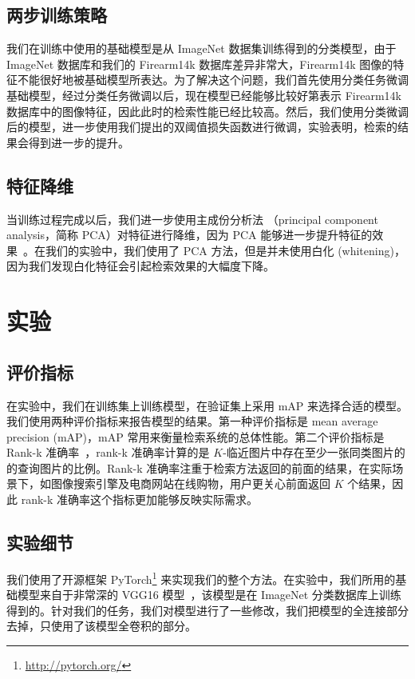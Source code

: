 \subsection{两步训练策略}
我们在训练中使用的基础模型是从 ImageNet 数据集训练得到的分类模型，由于 ImageNet 数据库和我们的 Firearm14k 数据库差异非常大，Firearm14k 图像的特征不能很好地被基础模型所表达。为了解决这个问题，我们首先使用分类任务微调基础模型，经过分类任务微调以后，现在模型已经能够比较好第表示 Firearm14k 数据库中的图像特征，因此此时的检索性能已经比较高。然后，我们使用分类微调后的模型，进一步使用我们提出的双阈值损失函数进行微调，实验表明，检索的结果会得到进一步的提升。

\subsection{特征降维}
当训练过程完成以后，我们进一步使用主成份分析法 （principal component analysis，简称 PCA）对特征进行降维，因为 PCA 能够进一步提升特征的效果~\cite{Radenovic2016CNNIR,Babenko2014NeuralCF,Tolias2015ParticularOR,Babenko2015AggregatingLD}。在我们的实验中，我们使用了 PCA 方法，但是并未使用白化 (whitening)，因为我们发现白化特征会引起检索效果的大幅度下降。

\section{实验}\label{sec:double_margin_exprt}
\subsection{评价指标}
在实验中，我们在训练集上训练模型，在验证集上采用 mAP 来选择合适的模型。我们使用两种评价指标来报告模型的结果。第一种评价指标是 mean average precision (mAP)，mAP 常用来衡量检索系统的总体性能。第二个评价指标是 Rank-k 准确率~\cite{Jgou2011ProductQF,Song2016DeepML}，rank-k 准确率计算的是 $K$-临近图片中存在至少一张同类图片的的查询图片的比例。Rank-k 准确率注重于检索方法返回的前面的结果，在实际场景下，如图像搜索引擎及电商网站在线购物，用户更关心前面返回 $K$ 个结果，因此 rank-k 准确率这个指标更加能够反映实际需求。

\subsection{实验细节}
我们使用了开源框架 PyTorch\footnote{\url{http://pytorch.org/}} 来实现我们的整个方法。在实验中，我们所用的基础模型来自于非常深的 VGG16 模型~\cite{Simonyan2014VeryDC}，该模型是在 ImageNet 分类数据库上训练得到的。针对我们的任务，我们对模型进行了一些修改，我们把模型的全连接部分去掉，只使用了该模型全卷积的部分。

